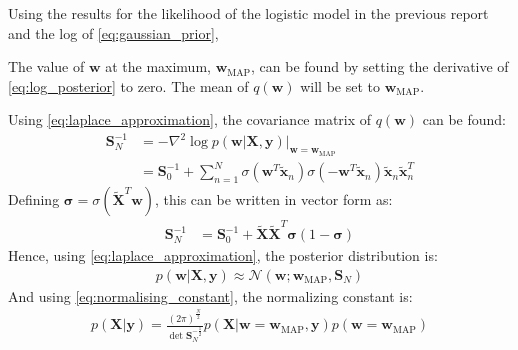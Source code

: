\documentclass[a4paper]{article}
\begin{document}
    Using the results for the likelihood of the logistic model in the previous report and the log of \autoref{eq:gaussian_prior},

    The value of $\bm{w}$ at the maximum, $\bm{w}_{\text{MAP}}$, can be found by setting the derivative of
    \autoref{eq:log_posterior} to zero.
    The mean of $q(\bm{w})$ will be set to $\bm{w}_{\text{MAP}}$.

    Using \autoref{eq:laplace_approximation}, the covariance matrix of $q(\bm{w})$ can be found:
    \begin{align}
        \bm{S}_N^{-1} &= -\nabla^2 \log p(\bm{w} | \bm{X}, \bm{y}) \big|_{\bm{w} =\bm{w}_{\text{MAP}}} \nonumber \\
        &= \bm{S}_0^{-1}
        + \sum_{n=1}^N \sigma(\bm{w}^T \tilde{\bm{x}}_n) \sigma(-\bm{w}^T \tilde{\bm{x}}_n)\tilde{\bm{x}}_n\tilde{\bm{x}}_n^T
    \end{align}
    Defining $\bm{\sigma} = \sigma(\tilde{\bm{X}}^T \bm{w})$, this can be written in vector form as:
    \begin{align}
         \bm{S}_N^{-1} &= \bm{S}_0^{-1} + \tilde{\bm{X}}\tilde{\bm{X}}^T \bm{\sigma} (1 - \bm{\sigma})
    \end{align}
    Hence, using \autoref{eq:laplace_approximation}, the posterior distribution is:
    \begin{align}
        p(\bm{w} | \bm{X}, \bm{y}) \approx \mathcal{N}(\bm{w}; \bm{w}_\text{MAP}, \bm{S}_N)
    \end{align}
    And using \autoref{eq:normalising_constant}, the normalizing constant is:
    \begin{align}
        p(\bm{X} | \bm{y}) = \frac{(2\pi)^\frac{N}{2}}{\det \bm{S}_N^{-\frac{1}{2}}}
                            p(\bm{X} | \bm{w} = \bm{w}_\text{MAP}, \bm{y}) p(\bm{w} = \bm{w}_\text{MAP})
    \end{align}
\end{document}
